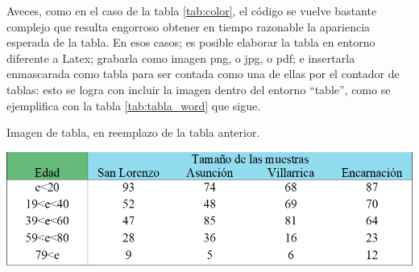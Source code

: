 Aveces, como en el caso de la tabla \ref{tab:color}, el código se vuelve bastante complejo que resulta engorroso obtener en tiempo razonable la apariencia esperada de la tabla. En esos casos; es posible elaborar la tabla en entorno diferente a Latex; grabarla como imagen png, o jpg, o pdf; e insertarla enmascarada como tabla para ser contada como una de ellas por el contador de tablas: esto se logra con incluir la imagen dentro del entorno ``table'', como se ejemplifica con la tabla \ref{tab:tabla_word} que sigue.

\begin{table}[H]
	\begin{center}
		\caption{Imagen de tabla, en reemplazo de la tabla anterior.}
		\label{tab:tabla_word}
		\includegraphics[scale=.65]{./capitulo_04/tabla_word.png}
	\end{center}
\end{table}

